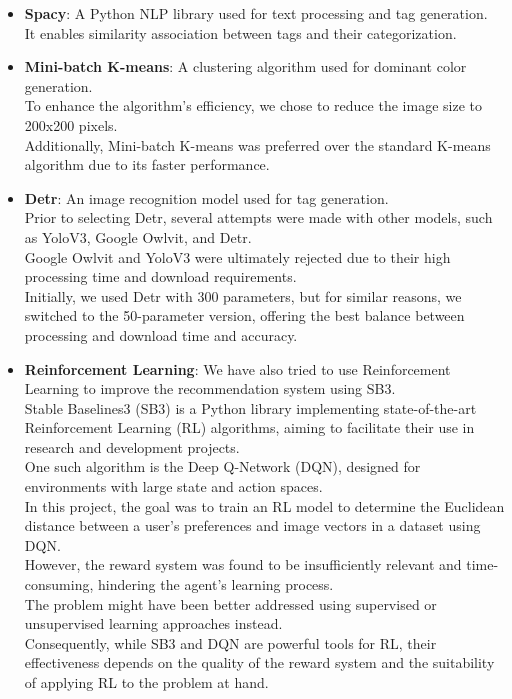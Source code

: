 \documentclass{article}
\begin{document}
    \begin{itemize}
        \item \textbf{Spacy}: A Python NLP library used for text processing and tag generation.\\It enables similarity association between tags and their categorization.
        \item \textbf{Mini-batch K-means}: A clustering algorithm used for dominant color generation.\\To enhance the algorithm's efficiency, we chose to reduce the image size to 200x200 pixels.\\Additionally, Mini-batch K-means was preferred over the standard K-means algorithm due to its faster performance.
        \item \textbf{Detr}: An image recognition model used for tag generation.\\Prior to selecting Detr, several attempts were made with other models, such as YoloV3, Google Owlvit, and Detr.\\Google Owlvit and YoloV3 were ultimately rejected due to their high processing time and download requirements.\\Initially, we used Detr with 300 parameters, but for similar reasons, we switched to the 50-parameter version, offering the best balance between processing and download time and accuracy.
        \item \textbf{Reinforcement Learning}: We have also tried to use Reinforcement Learning to improve the recommendation system using SB3.\\Stable Baselines3 (SB3) is a Python library implementing state-of-the-art Reinforcement Learning (RL) algorithms, aiming to facilitate their use in research and development projects.\\One such algorithm is the Deep Q-Network (DQN), designed for environments with large state and action spaces.\\In this project, the goal was to train an RL model to determine the Euclidean distance between a user's preferences and image vectors in a dataset using DQN.\\However, the reward system was found to be insufficiently relevant and time-consuming, hindering the agent's learning process.\\The problem might have been better addressed using supervised or unsupervised learning approaches instead.\\Consequently, while SB3 and DQN are powerful tools for RL, their effectiveness depends on the quality of the reward system and the suitability of applying RL to the problem at hand.
    \end{itemize}
\end{document}

